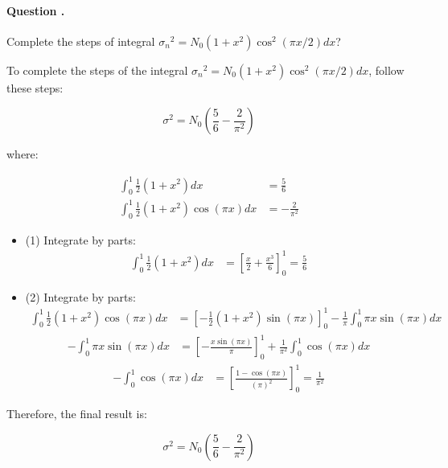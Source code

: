 \documentclass[14pt,a4paper]{report}
\newcounter{question}
\newcommand*\question{%
\stepcounter{question}%
\paragraph{Question \thesection.\thequestion}}
\begin{document}
\question
{
    Complete the steps of integral ${\sigma_{n}}^2 = N_0 (1 + x^2 ){\cos^2}(\pi x/2)dx$?
}
\begin{answer_box*}
    To complete the steps of the integral ${\sigma_{n}}^2 = N_0(1 + x^2){\cos^2}(\pi x/2)dx$, follow these steps:

    \begin{equation}\sigma^2 = N_0\left(\frac{5}{6} - \frac{2}{\pi^2}\right)\end{equation}

    where:

    \begin{align}
    \int_0^1 \frac{1}{2}(1 + x^2)dx &= \frac{5}{6} \tag{1}\\
    \int_0^1 \frac{1}{2}(1 + x^2)\cos(\pi x)dx &= -\frac{2}{\pi^2} \tag{2}
    \end{align}

    \begin{itemize}
        \item (1) Integrate by parts:
        \begin{align}\int_0^1 \frac{1}{2}(1 + x^2)dx &= \left[\frac{x}{2} + \frac{x^3}{6}\right]_0^1 = \frac{5}{6}\end{align}
        \item (2) Integrate by parts:
        \begin{align}\int_0^1 \frac{1}{2}(1 + x^2)\cos(\pi x)dx &= \left[-\frac{1}{2}(1 + x^2)\sin(\pi x)\right]_0^1 - \frac{1}{\pi}\int_0^1 \pi x \sin(\pi x)dx \end{align}
        \begin{align}-\int_0^1 \pi x \sin(\pi x)dx &= \left[-\frac{x\sin(\pi x)}{\pi}\right]_0^1 + \frac{1}{\pi^2}\int_0^1 \cos(\pi x)dx \end{align}
        \begin{align}-\int_0^1 \cos(\pi x)dx &= \left[\frac{1 - \cos(\pi x)}{(\pi)^2}\right]_0^1 = \frac{1}{\pi^2}\end{align}
    \end{itemize}

    Therefore, the final result is:

    \begin{equation}\sigma^2 = N_0\left(\frac{5}{6} - \frac{2}{\pi^2}\right)\end{equation}

\end{answer_box*}
\end{document}
